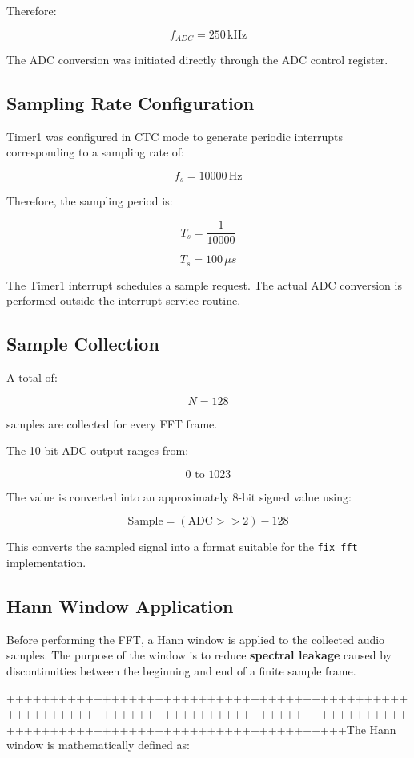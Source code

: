 \documentclass{article}
\begin{document}
\begin{center}
Therefore:

\[
f_{ADC} = 250\,\text{kHz}
\]

The ADC conversion was initiated directly through the ADC control register.

\subsection{Sampling Rate Configuration}

Timer1 was configured in CTC mode to generate periodic interrupts corresponding to a sampling rate of:

\[
f_s = 10000\,\text{Hz}
\]

Therefore, the sampling period is:

\[
T_s = \frac{1}{10000}
\]

\[
T_s = 100\,\mu s
\]

The Timer1 interrupt schedules a sample request. The actual ADC conversion is performed outside the interrupt service routine.

\subsection{Sample Collection}

A total of:

\[
N = 128
\]

samples are collected for every FFT frame.

The 10-bit ADC output ranges from:

\[
0 \text{ to } 1023
\]

The value is converted into an approximately 8-bit signed value using:

\[
\text{Sample} =
(\text{ADC} >> 2) - 128
\]

This converts the sampled signal into a format suitable for the \texttt{fix\_fft} implementation.

\subsection{Hann Window Application}

Before performing the FFT, a Hann window is applied to the collected audio samples. The purpose of the window is to reduce \textbf{spectral leakage} caused by discontinuities between the beginning and end of a finite sample frame.

+++++++++++++++++++++++++++++++++++++++++++++++++++++++++++++++++++++++++++++++++++++++++++++++++++++++++++++++++++++++++++++++++++The Hann window is mathematically defined as:


\end{center}
\end{document}
